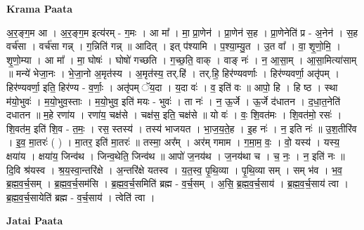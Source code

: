 \documentclass[17pt]{extarticle}
\begin{document}
\textbf{Krama Paata} \newline

अ॒र॒ङ्ग॒म आ । अ॒र॒ङ्ग॒म इत्य॑रम् - ग॒मः । आ मा᳚ । मा॒ प्रा॒णेन॑ । प्रा॒णेन॑ स॒ह । प्रा॒णेनेति॑ प्र - अ॒नेन॑ । स॒ह वर्च॑सा । वर्च॑सा गन्न् । ग॒न्निति॑ गन्न् ॥ आदित् । इत् प॑श्यामि । प॒श्या॒म्यु॒त । उ॒त वा᳚ । वा॒ शृ॒णो॒मि॒ । शृ॒णो॒म्या । आ मा᳚ । मा॒ घोषः॑ । घोषो॑ गच्छति । ग॒च्छ॒ति॒ वाक् । वाङ् नः॑ । न॒ आ॒सा॒म् । आ॒सा॒मित्या॑साम् ॥ मन्ये॑ भेजा॒नः । भे॒जा॒नो अ॒मृत॑स्य । अ॒मृत॑स्य॒ तर्.हि॑ । तर्.हि॒ हिर॑ण्यवर्णाः । हिर॑ण्यवर्णा॒ अतृ॑पम् । हिर॑ण्यवर्णा॒ इति॒ हिर॑ण्य - व॒र्णाः॒ । अतृ॑पम् ॅय॒दा । य॒दा वः॑ । व॒ इति॑ वः ॥ आपो॒ हि । हि ष्ठ । स्था म॑यो॒भुवः॑ । म॒यो॒भुव॒स्ताः । म॒यो॒भुव॒ इति॑ मयः - भुवः॑ । ता नः॑ । न॒ ऊ॒र्जे । ऊ॒र्जे द॑धातन । द॒धा॒त॒नेति॑ दधातन ॥ म॒हे रणा॑य । रणा॑य॒ चक्ष॑से । चक्ष॑स॒ इति॒ चक्ष॑से ॥ यो वः॑ । वः॒ शि॒वत॑मः । शि॒वत॑मो॒ रसः॑ । शि॒वत॑म॒ इति॑ शि॒व - त॒मः॒ । रस॒ स्तस्य॑ । तस्य॑ भाजयत । भा॒ज॒य॒ते॒ह । इ॒ह नः॑ । न॒ इति नः॑ ॥ उ॒श॒तीरि॑व । इ॒व॒ मा॒तरः॑ ( ) । मा॒तर॒ इति॑ मा॒तरः॑ ॥ तस्मा॒ अर᳚म् । अर॑म् गमाम । ग॒मा॒म॒ वः॒ । वो॒ यस्य॑ । यस्य॒ क्षया॑य । क्षया॑य॒ जिन्व॑थ । जिन्व॒थेति॒ जिन्व॑थ ॥ आपो॑ ज॒नय॑थ । ज॒नय॑था च । च॒ नः॒ । न॒ इति॑ नः ॥ दि॒वि श्र॑यस्व । श्र॒य॒स्वा॒न्तरि॑क्षे । अ॒न्तरि॑क्षे यतस्व । य॒त॒स्व॒ पृ॒थि॒व्या । पृ॒थि॒व्या सम् । सम् भ॑व । भ॒व॒ ब्र॒ह्म॒व॒र्च॒सम् । ब्र॒ह्म॒व॒र्च॒सम॑सि । ब्र॒ह्म॒व॒र्च॒समिति॑ ब्रह्म - व॒र्च॒सम् । अ॒सि॒ ब्र॒ह्म॒व॒र्च॒साय॑ । ब्र॒ह्म॒व॒र्च॒साय॑ त्वा । ब्र॒ह्म॒व॒र्च॒सायेति॑ ब्रह्म - व॒र्च॒साय॑ । त्वेति॑ त्वा । \newline

\textbf{Jatai Paata} \newline
\end{document}
